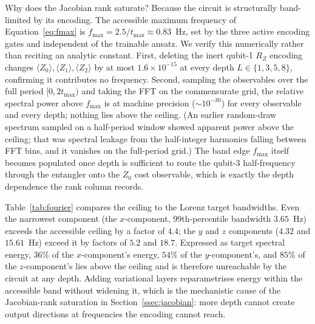 \documentclass[a4paper,12pt]{iopart}
\newcommand{\Zexp}[1]{\langle Z_{#1}\rangle}
\begin{document}
Why does the Jacobian rank saturate? Because the circuit is structurally
band-limited by its encoding. The accessible maximum frequency of
Equation~\eqref{eq:fmax} is $f_{\max}=2.5/t_{\max}\approx0.83$~Hz, set by the
three active encoding gates and independent of the trainable ansatz. We verify
this numerically rather than reciting an analytic constant. First, deleting the
inert qubit-1 $R_Z$ encoding changes $\Zexp{0},\Zexp{1},\Zexp{2}$ by at most
$1.6\times10^{-15}$ at every depth $L\in\{1,3,5,8\}$, confirming it contributes
no frequency. Second, sampling the observables over the full period
$[0,2t_{\max})$ and taking the FFT on the commensurate grid, the relative
spectral power above $f_{\max}$ is at machine precision
($\sim\!10^{-30}$) for every observable and every depth; nothing lies above the
ceiling. (An earlier random-draw spectrum sampled on a half-period window showed
apparent power above the ceiling; that was spectral leakage from the
half-integer harmonics falling between FFT bins, and it vanishes on the
full-period grid.) The band edge $f_{\max}$ itself becomes populated once depth
is sufficient to route the qubit-3 half-frequency through the entangler onto the
$Z_0$ cost observable, which is exactly the depth dependence the rank column
records.

Table~\ref{tab:fourier} compares the ceiling to the Lorenz target bandwidths.
Even the narrowest component (the $x$-component, $99$th-percentile bandwidth
$3.65$~Hz) exceeds the accessible ceiling by a factor of $4.4$; the $y$ and $z$
components ($4.32$ and $15.61$~Hz) exceed it by factors of $5.2$ and $18.7$.
Expressed as target spectral energy, $36\%$ of the $x$-component's energy,
$54\%$ of the $y$-component's, and $85\%$ of the $z$-component's lies above the
ceiling and is therefore unreachable by the circuit at any depth. Adding
variational layers reparametrises energy within the accessible band without
widening it, which is the mechanistic cause of the Jacobian-rank saturation in
Section~\ref{ssec:jacobian}: more depth cannot create output directions at
frequencies the encoding cannot reach.
\end{document}
